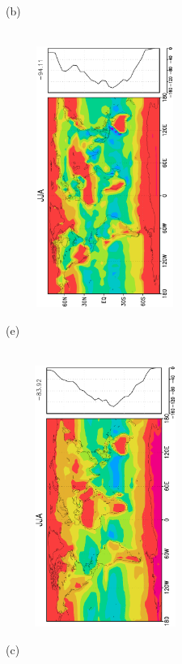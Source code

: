 \documentclass[12pt,a4paper,twoside,openright,headinclude,liststotoc,bibtotoc]{scrreprt}
\begin{document}
\begin{appendix}
\begin{figure}[c]
{}
\parbox{8.5cm}{\hspace{0.50cm}\begin{scriptsize} (b)\end{scriptsize} \vspace{-0.5cm} \\
\includegraphics[height=8.5cm,width=6.5cm,angle=-90]
{eps/zonalysmslhflu147JJA.eps}
}
\parbox{8.5cm}{\hspace{0.25cm}\begin{scriptsize} (e)\end{scriptsize} \vspace{-0.5cm} \\
\includegraphics[height=8.5cm,width=6.5cm,angle=-90]
{eps/zonalt21ysmslhfl147JJAfinal.eps}
}
\parbox{8.5cm}{\hspace{0.5cm}\begin{scriptsize} (c)\end{scriptsize} \vspace{-0.5cm} \\
}
\end{figure}
\end{appendix}
\end{document}
